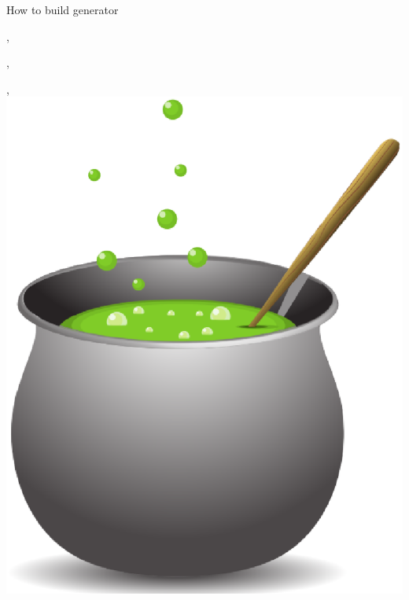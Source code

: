 \begin{wideslide}[toc=Cooking generator]{How to build generator}
\null\vfill

  \sep

  \twocolumn
  {
     \sep
    
    \centering\scalebox{0.75}{}
  }
  {
     \sep
    \centering\includegraphics[width = \columnwidth]{figures/kociol}
  }
  
\vfill\null
\end{wideslide}